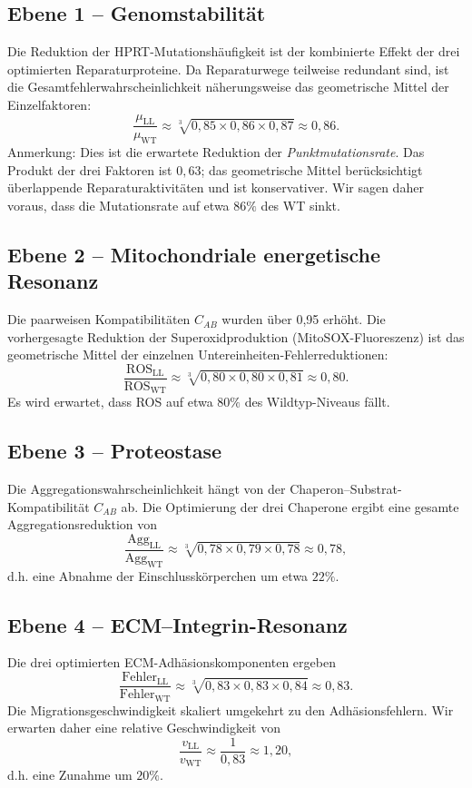 \documentclass[12pt,a4paper]{article}
\begin{document}
	\subsection{Ebene 1 – Genomstabilität}
	Die Reduktion der HPRT-Mutationshäufigkeit ist der kombinierte Effekt der drei optimierten Reparaturproteine. Da Reparaturwege teilweise redundant sind, ist die Gesamtfehlerwahrscheinlichkeit näherungsweise das geometrische Mittel der Einzelfaktoren:
	\[
	\frac{\mu_{\mathrm{LL}}}{\mu_{\mathrm{WT}}} \approx \sqrt[3]{0,85 \times 0,86 \times 0,87} \approx 0,86.
	\]
	Anmerkung: Dies ist die erwartete Reduktion der \emph{Punktmutationsrate}. Das Produkt der drei Faktoren ist \(0,63\); das geometrische Mittel berücksichtigt überlappende Reparaturaktivitäten und ist konservativer. Wir sagen daher voraus, dass die Mutationsrate auf etwa \(86\%\) des WT sinkt.
	
	\subsection{Ebene 2 – Mitochondriale energetische Resonanz}
	Die paarweisen Kompatibilitäten \(C_{AB}\) wurden über 0,95 erhöht. Die vorhergesagte Reduktion der Superoxidproduktion (MitoSOX-Fluoreszenz) ist das geometrische Mittel der einzelnen Untereinheiten-Fehlerreduktionen:
	\[
	\frac{\mathrm{ROS}_{\mathrm{LL}}}{\mathrm{ROS}_{\mathrm{WT}}} \approx \sqrt[3]{0,80 \times 0,80 \times 0,81} \approx 0,80.
	\]
	Es wird erwartet, dass ROS auf etwa \(80\%\) des Wildtyp-Niveaus fällt.
	
	\subsection{Ebene 3 – Proteostase}
	Die Aggregationswahrscheinlichkeit hängt von der Chaperon–Substrat-Kompatibilität \(C_{AB}\) ab. Die Optimierung der drei Chaperone ergibt eine gesamte Aggregationsreduktion von
	\[
	\frac{\mathrm{Agg}_{\mathrm{LL}}}{\mathrm{Agg}_{\mathrm{WT}}} \approx \sqrt[3]{0,78 \times 0,79 \times 0,78} \approx 0,78,
	\]
	d.h. eine Abnahme der Einschlusskörperchen um etwa \(22\%\).
	
	\subsection{Ebene 4 – ECM–Integrin-Resonanz}
	Die drei optimierten ECM-Adhäsionskomponenten ergeben
	\[
	\frac{\mathrm{Fehler}_{\mathrm{LL}}}{\mathrm{Fehler}_{\mathrm{WT}}} \approx \sqrt[3]{0,83 \times 0,83 \times 0,84} \approx 0,83.
	\]
	Die Migrationsgeschwindigkeit skaliert umgekehrt zu den Adhäsionsfehlern. Wir erwarten daher eine relative Geschwindigkeit von
	\[
	\frac{v_{\mathrm{LL}}}{v_{\mathrm{WT}}} \approx \frac{1}{0,83} \approx 1,20,
	\]
	d.h. eine Zunahme um \(20\%\).
	
\end{document}
